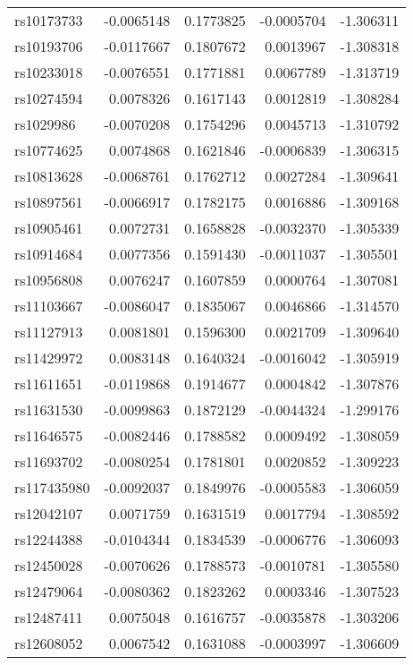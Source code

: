\documentclass[
]{article}
\theoremstyle{plain}
\begin{document}
{\begin{longtable}[t]{lrrrr}
\endfoot
\bottomrule
\endlastfoot
rs10173733 & -0.0065148 & 0.1773825 & -0.0005704 & -1.306311\\
rs10193706 & -0.0117667 & 0.1807672 & 0.0013967 & -1.308318\\
rs10233018 & -0.0076551 & 0.1771881 & 0.0067789 & -1.313719\\
rs10274594 & 0.0078326 & 0.1617143 & 0.0012819 & -1.308284\\
rs1029986 & -0.0070208 & 0.1754296 & 0.0045713 & -1.310792\\
\addlinespace
rs10774625 & 0.0074868 & 0.1621846 & -0.0006839 & -1.306315\\
rs10813628 & -0.0068761 & 0.1762712 & 0.0027284 & -1.309641\\
rs10897561 & -0.0066917 & 0.1782175 & 0.0016886 & -1.309168\\
rs10905461 & 0.0072731 & 0.1658828 & -0.0032370 & -1.305339\\
rs10914684 & 0.0077356 & 0.1591430 & -0.0011037 & -1.305501\\
\addlinespace
rs10956808 & 0.0076247 & 0.1607859 & 0.0000764 & -1.307081\\
rs11103667 & -0.0086047 & 0.1835067 & 0.0046866 & -1.314570\\
rs11127913 & 0.0081801 & 0.1596300 & 0.0021709 & -1.309640\\
rs11429972 & 0.0083148 & 0.1640324 & -0.0016042 & -1.305919\\
rs11611651 & -0.0119868 & 0.1914677 & 0.0004842 & -1.307876\\
\addlinespace
rs11631530 & -0.0099863 & 0.1872129 & -0.0044324 & -1.299176\\
rs11646575 & -0.0082446 & 0.1788582 & 0.0009492 & -1.308059\\
rs11693702 & -0.0080254 & 0.1781801 & 0.0020852 & -1.309223\\
rs117435980 & -0.0092037 & 0.1849976 & -0.0005583 & -1.306059\\
rs12042107 & 0.0071759 & 0.1631519 & 0.0017794 & -1.308592\\
\addlinespace
rs12244388 & -0.0104344 & 0.1834539 & -0.0006776 & -1.306093\\
rs12450028 & -0.0070626 & 0.1788573 & -0.0010781 & -1.305580\\
rs12479064 & -0.0080362 & 0.1823262 & 0.0003346 & -1.307523\\
rs12487411 & 0.0075048 & 0.1616757 & -0.0035878 & -1.303206\\
rs12608052 & 0.0067542 & 0.1631088 & -0.0003997 & -1.306609\\

\end{longtable}}
\end{document}

